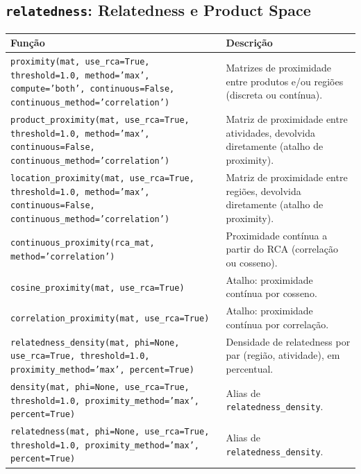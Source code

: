 \subsection{\texttt{relatedness}: Relatedness e Product Space}
\begin{longtable}{>{\raggedright\arraybackslash}p{9.2cm} >{\raggedright\arraybackslash}p{7.0cm}}
\toprule
\textbf{Fun\c{c}\~{a}o} & \textbf{Descri\c{c}\~{a}o} \\
\midrule\endhead
\texttt{\footnotesize proximity(mat, use\_rca=True, threshold=1.0, method='max', compute='both', continuous=False, continuous\_method='correlation')} & {\small Matrizes de proximidade entre produtos e/ou regi\~{o}es (discreta ou cont\'{i}nua).} \\[2pt]
\texttt{\footnotesize product\_proximity(mat, use\_rca=True, threshold=1.0, method='max', continuous=False, continuous\_method='correlation')} & {\small Matriz de proximidade entre atividades, devolvida diretamente (atalho de proximity).} \\[2pt]
\texttt{\footnotesize location\_proximity(mat, use\_rca=True, threshold=1.0, method='max', continuous=False, continuous\_method='correlation')} & {\small Matriz de proximidade entre regi\~{o}es, devolvida diretamente (atalho de proximity).} \\[2pt]
\texttt{\footnotesize continuous\_proximity(rca\_mat, method='correlation')} & {\small Proximidade cont\'{i}nua a partir do RCA (correla\c{c}\~{a}o ou cosseno).} \\[2pt]
\texttt{\footnotesize cosine\_proximity(mat, use\_rca=True)} & {\small Atalho: proximidade cont\'{i}nua por cosseno.} \\[2pt]
\texttt{\footnotesize correlation\_proximity(mat, use\_rca=True)} & {\small Atalho: proximidade cont\'{i}nua por correla\c{c}\~{a}o.} \\[2pt]
\texttt{\footnotesize relatedness\_density(mat, phi=None, use\_rca=True, threshold=1.0, proximity\_method='max', percent=True)} & {\small Densidade de relatedness por par (regi\~{a}o, atividade), em percentual.} \\[2pt]
\texttt{\footnotesize density(mat, phi=None, use\_rca=True, threshold=1.0, proximity\_method='max', percent=True)} & {\small Alias de \texttt{relatedness\_density}.} \\[2pt]
\texttt{\footnotesize relatedness(mat, phi=None, use\_rca=True, threshold=1.0, proximity\_method='max', percent=True)} & {\small Alias de \texttt{relatedness\_density}.} \\[2pt]

\end{longtable}
